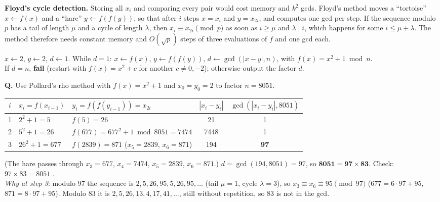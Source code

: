 \textbf{Floyd's cycle detection.} Storing all $x_i$ and comparing every pair would cost memory and $k^2$ gcds. Floyd's method moves a ``tortoise'' $x \leftarrow f(x)$ and a ``hare'' $y \leftarrow f(f(y))$, so that after $i$ steps $x = x_i$ and $y = x_{2i}$, and computes one gcd per step. If the sequence modulo $p$ has a tail of length $\mu$ and a cycle of length $\lambda$, then $x_i \equiv x_{2i} \pmod p$ as soon as $i \ge \mu$ and $\lambda \mid i$, which happens for some $i \le \mu + \lambda$. The method therefore needs constant memory and $O(\sqrt p)$ steps of three evaluations of $f$ and one gcd each.

\begin{keybox}[title={Pollard rho with Floyd cycle detection}]
$x \leftarrow 2$, $y \leftarrow 2$, $d \leftarrow 1$. While $d = 1$: $x \leftarrow f(x)$, $y \leftarrow f(f(y))$, $d \leftarrow \gcd(|x - y|, n)$, with $f(x) = x^2 + 1 \bmod n$.\\
If $d = n$, \textbf{fail} (restart with $f(x) = x^2 + c$ for another $c \neq 0, -2$); otherwise output the factor $d$.
\end{keybox}

\begin{worked}[: Pollard rho on $n = 8051$]
\textbf{Q.} Use Pollard's rho method with $f(x) = x^2 + 1$ and $x_0 = y_0 = 2$ to factor $n = 8051$.
\begin{center}\small
\begin{tabular}{@{}cllcc@{}}
\toprule
$i$ & $x_i = f(x_{i-1})$ & $y_i = f(f(y_{i-1})) = x_{2i}$ & $|x_i - y_i|$ & $\gcd(|x_i - y_i|, 8051)$\\
\midrule
1 & $2^2 + 1 = 5$ & $f(5) = 26$ & 21 & 1\\
2 & $5^2 + 1 = 26$ & $f(677) = 677^2 + 1 \bmod 8051 = 7474$ & 7448 & 1\\
3 & $26^2 + 1 = 677$ & $f(2839) = 871$ \;($x_5 = 2839$, $x_6 = 871$) & 194 & \textbf{97}\\
\bottomrule
\end{tabular}
\end{center}
(The hare passes through $x_3 = 677$, $x_4 = 7474$, $x_5 = 2839$, $x_6 = 871$.) $d = \gcd(194, 8051) = 97$, so $\mathbf{8051 = 97 \times 83}$. Check: $97 \times 83 = 8051$ \checkmark.\\
\emph{Why at step 3}: modulo 97 the sequence is $2, 5, 26, 95, 5, 26, 95, \dots$ (tail $\mu = 1$, cycle $\lambda = 3$), so $x_3 \equiv x_6 \equiv 95 \pmod{97}$ ($677 = 6 \cdot 97 + 95$, $871 = 8 \cdot 97 + 95$). Modulo 83 it is $2, 5, 26, 13, 4, 17, 41, \dots$, still without repetition, so 83 is not in the gcd.
\end{worked}

